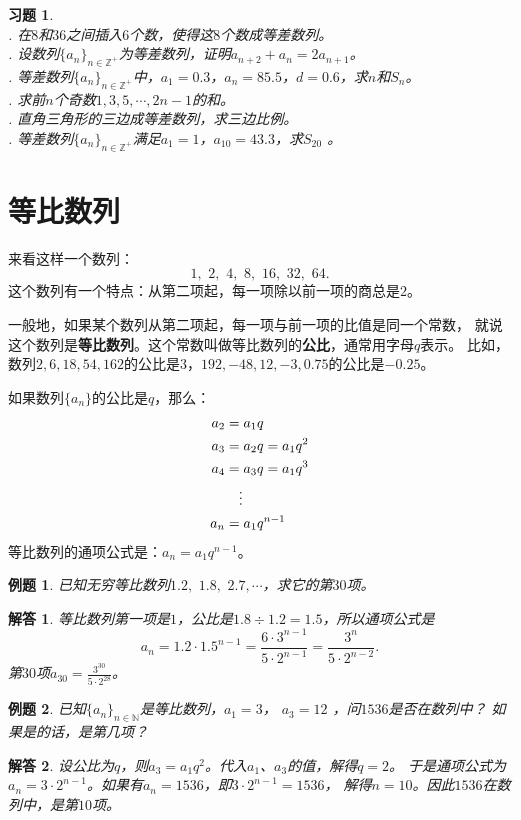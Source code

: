 \documentclass[12pt,UTF8]{ctexbook}
\newtheorem{et}{例题}[section]
\newtheorem*{so}{解答}
\newtheorem{xt}{习题}[section]
\begin{document}
\begin{xt}
    \mbox{} \\
    . 在$8$和$36$之间插入$6$个数，使得这$8$个数成等差数列。\\
    . 设数列$\{a_n\}_{n\in\mathbb{Z}^+}$为等差数列，证明$a_{n+2} + a_n = 2a_{n+1}$。\\
    . 等差数列$\{a_n\}_{n\in\mathbb{Z}^+}$中，$a_1 = 0.3$，$a_n = 85.5$，$d = 0.6$，求$n$和$S_n$。\\
    . 求前$n$个奇数$1,3,5,\cdots, 2n-1$的和。\\
    . 直角三角形的三边成等差数列，求三边比例。\\
    . 等差数列$\{a_n\}_{n\in\mathbb{Z}^+}$满足$a_1 = 1$，$a_{10}=43.3$，求$S_{20}$ 。    
\end{xt}

\section{等比数列}

来看这样一个数列：
$$ 1,\,\,2,\,\,4,\,\,8,\,\,16,\,\,32,\,\,64. $$
这个数列有一个特点：从第二项起，每一项除以前一项的商总是$2$。

一般地，如果某个数列从第二项起，每一项与前一项的比值是同一个常数，
就说这个数列是\textbf{等比数列}。这个常数叫做等比数列的\textbf{公比}，通常用字母$q$表示。
比如，数列$2,6,18,54,162$的公比是$3$，$192,-48,12,-3,0.75$的公比是$-0.25$。

如果数列$\{a_n\}$的公比是$q$，那么：
\begin{align}
a_2 &= a_1 q  \notag \\
a_3 &= a_2 q = a_1 q^2 \notag \\
a_4 &= a_3 q = a_1 q^3 \notag \\
&\quad \vdots \notag \\
a_n &= a_1 q^{n-1} \notag 
\end{align}
等比数列的通项公式是：$a_n = a_1 q^{n-1}$。
\begin{et}
    已知无穷等比数列$1.2, \,\,1.8,\,\,2.7, \cdots$，求它的第$30$项。    
\end{et}
\begin{so}
等比数列第一项是$1$，公比是$1.8\div1.2=1.5$，所以通项公式是
$$a_n = 1.2 \cdot 1.5^{n-1} = \frac{6\cdot3^{n-1}}{5\cdot2^{n-1}} = \frac{3^n}{5\cdot 2^{n-2}}.$$
第$30$项$a_{30} = \frac{3^{30}}{5\cdot 2^{28}}$。
\end{so}
\begin{et}
    已知$\{a_n\}_{n\in\mathbb{N}}$是等比数列，$a_1 = 3$， $a_3 = 12$ ，问$1536$是否在数列中？
    如果是的话，是第几项？    
\end{et}
\begin{so}
    设公比为$q$，则$a_3 = a_1 q^2$。代入$a_1$、$a_3$的值，解得$q = 2$。
    于是通项公式为$a_n = 3\cdot 2^{n-1}$。如果有$a_n = 1536$，即$3\cdot2^{n-1}=1536$，
    解得$n = 10$。因此$1536$在数列中，是第$10$项。    
\end{so}
\end{document}
